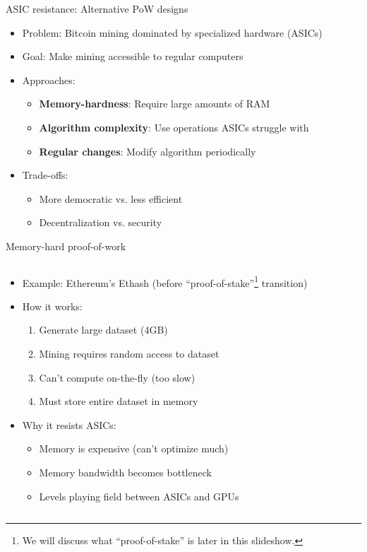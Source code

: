 \documentclass[aspectratio=169, lualatex, handout]{beamer}
\begin{document}
\begin{frame}{ASIC resistance: Alternative PoW designs}
	\begin{itemize}
		\item Problem: Bitcoin mining dominated by specialized hardware (ASICs)
		\item Goal: Make mining accessible to regular computers
		\item Approaches:
		      \begin{itemize}
			      \item \textbf{Memory-hardness}: Require large amounts of RAM
			      \item \textbf{Algorithm complexity}: Use operations ASICs struggle with
			      \item \textbf{Regular changes}: Modify algorithm periodically
		      \end{itemize}
		\item Trade-offs:
		      \begin{itemize}
			      \item More democratic vs. less efficient
			      \item Decentralization vs. security
		      \end{itemize}
	\end{itemize}
\end{frame}

\begin{frame}{Memory-hard proof-of-work}
	\begin{columns}[c]
		\begin{column}{1\textwidth}
			\begin{itemize}
				\item Example: Ethereum's Ethash (before ``proof-of-stake''\footnote{We will discuss what ``proof-of-stake'' is later in this slideshow.} transition)
				\item How it works:
				      \begin{enumerate}
					      \item Generate large dataset (\approx4GB)
					      \item Mining requires random access to dataset
					      \item Can't compute on-the-fly (too slow)
					      \item Must store entire dataset in memory
				      \end{enumerate}
				\item Why it resists ASICs:
				      \begin{itemize}
					      \item Memory is expensive (can't optimize much)
					      \item Memory bandwidth becomes bottleneck
					      \item Levels playing field between ASICs and GPUs
				      \end{itemize}
			\end{itemize}
		\end{column}
	\end{columns}
\end{frame}
\end{document}
